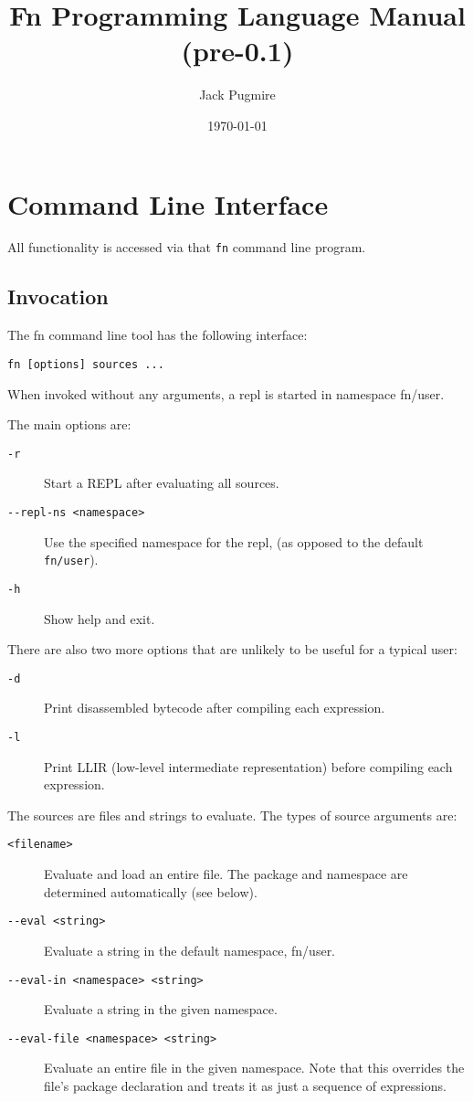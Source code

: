 \documentclass[11pt]{article}
\author{Jack Pugmire}
\date{\today}
\title{Fn Programming Language Manual (pre-0.1)}
\begin{document}
\maketitle
\tableofcontents


\section{Command Line Interface}
\label{sec:orgd42282c}

All functionality is accessed via that \texttt{fn} command line program.

\subsection{Invocation}
\label{sec:orgabc4d33}

The fn command line tool has the following interface:
\begin{verbatim}
fn [options] sources ...
\end{verbatim}

When invoked without any arguments, a repl is started in namespace fn/user.

The main options are:
\begin{description}
\item[{\texttt{-r}}] Start a REPL after evaluating all sources.
\item[{\texttt{-{}-repl-ns <namespace>}}] Use the specified namespace for the repl, (as opposed
to the default \texttt{fn/user}).
\item[{\texttt{-h}}] Show help and exit.
\end{description}
There are also two more options that are unlikely to be useful for a typical
user:
\begin{description}
\item[{\texttt{-d}}] Print disassembled bytecode after compiling each expression.
\item[{\texttt{-l}}] Print LLIR (low-level intermediate representation) before compiling each
expression.
\end{description}

The sources are files and strings to evaluate. The types of source arguments
are:
\begin{description}
\item[{\texttt{<filename>}}] Evaluate and load an entire file. The package and namespace are
determined automatically (see below).
\item[{\texttt{-{}-eval <string>}}] Evaluate a string in the default namespace, fn/user.
\item[{\texttt{-{}-eval-in <namespace> <string>}}] Evaluate a string in the given namespace.
\item[{\texttt{-{}-eval-file <namespace> <string>}}] Evaluate an entire file in the given
namespace. Note that this overrides the file's package declaration and treats
it as just a sequence of expressions.
\end{description}
\end{document}
